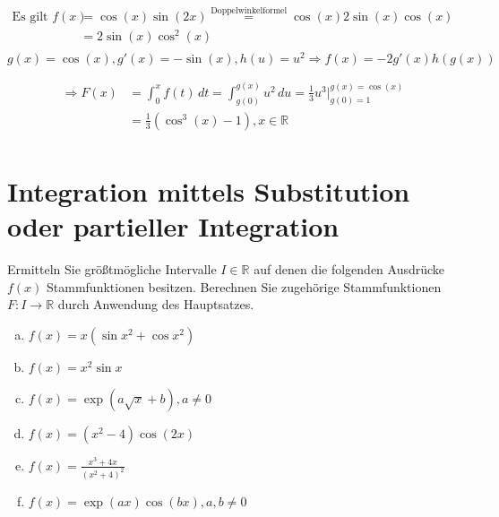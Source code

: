 \documentclass{article}
\begin{document}
\begin{enumerate}[a)]
  \begin{align*}
    \text{Es gilt } f(x) &= \cos (x) \sin (2x) \overset{\text{Doppelwinkelformel}}= \cos (x) 2 \sin (x) \cos (x) \\
                         &= 2 \sin (x) \cos^2 (x) \\
  \end{align*}
  $g(x) = \cos(x), g'(x) = - \sin(x), h(u) = u^2 \Rightarrow f(x) = -2 g'(x) h(g(x))$

  \begin{align*}
    \Rightarrow F(x) &= \int_0^x f(t) \,dt = \int_{g(0)}^{g(x)} u^2 \,du = \frac{1}{3} u^3 {\Big |}_{g(0) = 1}^{g(x) = \cos(x)} \\
                     &= \frac{1}{3} (\cos^3 (x) - 1 ), x \in \mathbb{R} \\
  \end{align*}

 \end{enumerate}

\section*{Integration mittels Substitution oder partieller Integration}

Ermitteln Sie größtmögliche Intervalle $I \in \mathbb{R}$ auf denen die
folgenden Ausdrücke $f(x)$ Stammfunktionen besitzen.
Berechnen Sie zugehörige Stammfunktionen $F \colon I \to \mathbb{R}$
durch Anwendung des Hauptsatzes.

\begin{enumerate}[a)]
\item $f(x) = x (\sin x^2 + \cos x^2)$
\item $f(x) = x^2 \sin x$
\item $f(x) = \exp\left( a \sqrt{x} + b \right), a \ne 0$
\item $f(x) = (x^2 -  4) \cos(2x)$
\item $f(x) = \frac{x^3 + 4x}{(x^2 + 4)^2}$
\item $f(x) = \exp(ax) \cos(bx), a, b \ne 0$
\end{enumerate}
\end{document}

